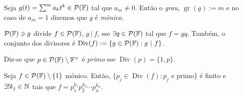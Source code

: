 \newcommand{\gr}{\operatorname{gr}}
\begin{definition}
    Seja \(g(t) = \sum^m a_k t^k \in \mathcal{P}(\mathbb{F})\) tal que \(a_m \neq 0\). Então o \emph{grau}, \(\gr(g):= m\) e no caso de \(a_m =1\) dizemos que \(g\) é \emph{mônico}. 
\end{definition}


\newcommand{\dIv}{\operatorname{Div}}
\begin{definition}
    \(\mathcal{P}(\mathbb{F}) \ni g\) divide \(f \in \mathcal{P}(\mathbb{F})\), \(g\ | \ f\),  sse \(\exists q \in \mathcal{P}(\mathbb{F})\) tal que \(f = gq\). Também, o conjunto dos divisores é \(\dIv(f):= \{g\in \Pol : g\ | \ f\}\). 
\end{definition}

\begin{definition}
    Diz-se que \(p \in \mathcal{P}(\mathbb{F})\setminus \mathbb{F}^\times \) é \emph{primo} sse \(\dIv(p) = \{1, p\}\). 
\end{definition}

\theoremnum{\ \hspace{-0.3cm}}
\begin{theorem}
    Seja \(f\in \mathcal{P}(\mathbb{F}) \setminus \{1\}\) mônico. Então, \(\{p_j \in \dIv(f): p_j \text{ e primo}\}\) é finito e \(\exists !k_j \in \mathbb{N}\) tais que \(f = p_1^{k_1}p_2^{k_2}\cdots p_n^{k_n}\). 
\end{theorem}


